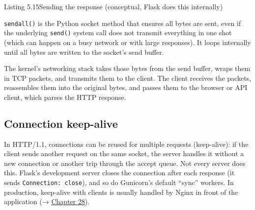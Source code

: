 \begin{codeboxcap}[short]{\textcolor{accent}{Listing 5.15}\enspace Sending the response (conceptual, Flask does this internally)}

\begin{Shaded}
\begin{Highlighting}[]
\OperatorTok{=}\NormalTok{ (}
    \StringTok{\textquotesingle{}}
\NormalTok{)}

\end{Highlighting}
\end{Shaded}

\end{codeboxcap}

\noindent{}\texttt{sendall()} is the Python socket method that ensures all bytes are sent, even if the underlying \texttt{send()} system call does not transmit everything in one shot (which can happen on a busy network or with large responses). It loops internally until all bytes are written to the socket's send buffer.

The kernel's networking stack takes those bytes from the send buffer, wraps them in TCP packets, and transmits them to the client. The client receives the packets, reassembles them into the original bytes, and passes them to the browser or API client, which parses the HTTP response.

\subsection*{Connection keep-alive}\label{05-internal-request-execution:connection-keep-alive}

In HTTP/1.1, connections can be reused for multiple requests (keep-alive): if the client sends another request on the same socket, the server handles it without a new connection or another trip through the accept queue. Not every server does this. Flask's development server closes the connection after each response (it sends \texttt{Connection:\ close}), and so do Gunicorn's default ``sync'' workers. In production, keep-alive with clients is usually handled by Nginx in front of the application (→ \hyperref[ch:28-traffic-routing]{Chapter 28}).

